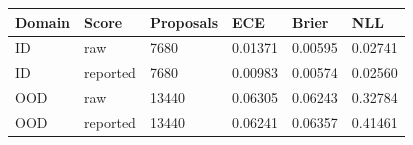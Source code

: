 \begin{tabular}{llllll}
\toprule
Domain & Score & Proposals & ECE & Brier & NLL \\
\midrule
ID & raw & 7680 & 0.01371 & 0.00595 & 0.02741 \\
ID & reported & 7680 & 0.00983 & 0.00574 & 0.02560 \\
OOD & raw & 13440 & 0.06305 & 0.06243 & 0.32784 \\
OOD & reported & 13440 & 0.06241 & 0.06357 & 0.41461 \\
\bottomrule
\end{tabular}
